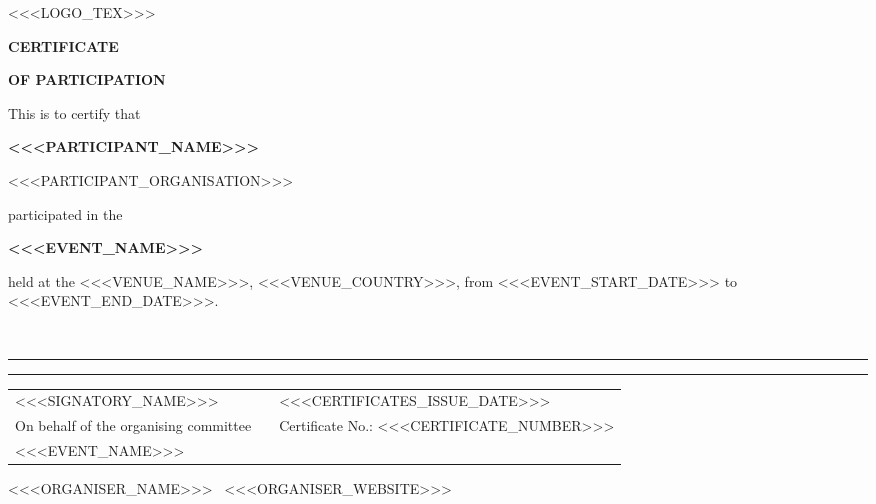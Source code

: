 \documentclass[a4paper,12pt]{article}
\newcommand{\ParticipantName}{<<<PARTICIPANT_NAME>>>}
\newcommand{\ParticipantAffiliation}{<<<PARTICIPANT_ORGANISATION>>>}
\newcommand{\CertificateDate}{<<<CERTIFICATES_ISSUE_DATE>>>}
\newcommand{\CertificateNumber}{<<<CERTIFICATE_NUMBER>>>}
\begin{document}
\begin{center}
  <<<LOGO_TEX>>>
\end{center}

\vspace{18mm}

\begin{center}
  {\fontsize{25}{30}\selectfont\bfseries CERTIFICATE}
  \par\vspace{4mm}
  {\fontsize{14}{18}\selectfont\bfseries OF PARTICIPATION}
\end{center}

\vspace{18mm}

\begin{center}
\begin{minipage}{0.88\textwidth}
\centering
{}
\fontsize{14}{20}\selectfont

This is to certify that

\vspace{5mm}
{\fontsize{20}{25}\selectfont\bfseries \ParticipantName}

\vspace{4mm}
{\fontsize{13}{18}\selectfont \ParticipantAffiliation}

\vspace{8mm}
participated in the

\vspace{3mm}
{\fontsize{17}{22}\selectfont\bfseries <<<EVENT_NAME>>>}

\vspace{5mm}
held at the <<<VENUE_NAME>>>, <<<VENUE_COUNTRY>>>,
from <<<EVENT_START_DATE>>> to <<<EVENT_END_DATE>>>.

\end{minipage}
\end{center}

\vfill

\begin{center}
\hspace{35mm}\makebox[52mm]{}\\
\rule{52mm}{0.4pt}
\hspace{35mm}
\rule{52mm}{0.4pt}

\vspace{2mm}
\begin{tabular}{>{\centering\arraybackslash}p{52mm} @{}p{35mm}@{} >{\centering\arraybackslash}p{52mm}}
<<<SIGNATORY_NAME>>> & & \CertificateDate \\
On behalf of the organising committee & & \small Certificate No.: \CertificateNumber \\
<<<EVENT_NAME>>> & & \\
\end{tabular}
\end{center}

\vspace{8mm}

\begin{center}
{\small\color{gray}<<<ORGANISER_NAME>>> \textbullet\ <<<ORGANISER_WEBSITE>>>}
\end{center}
\end{document}
